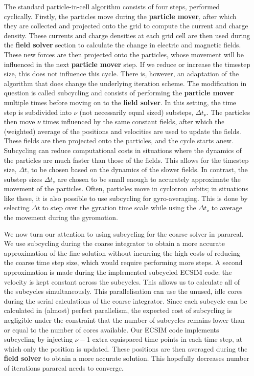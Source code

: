 The standard particle-in-cell algorithm consists of four steps, performed cyclically. Firstly, the particles move during the \textbf{particle mover}, after which they are collected and projected onto the grid to compute the current and charge density. These currents and charge densities at each grid cell are then used during the \textbf{field solver} section to calculate the change in electric and magnetic fields. These new forces are then projected onto the particles, whose movement will be influenced in the next \textbf{particle mover} step. If we reduce or increase the timestep size, this does not influence this cycle. There is, however, an adaptation of the algorithm that does change the underlying iteration scheme. The modification in question is called subcycling and consists of performing the \textbf{particle mover} multiple times before moving on to the \textbf{field solver}. In this setting, the time step is subdivided into $\nu$ (not necessarily equal sized) substeps, $\Delta t_\nu$. The particles then move $\nu$ times influenced by the same constant fields, after which the (weighted) average of the positions and velocities are used to update the fields. These fields are then projected onto the particles, and the cycle starts anew. Subcycling can reduce computational costs in situations where the dynamics of the particles are much faster than those of the fields. This allows for the timestep size, $\Delta t$, to be chosen based on the dynamics of the slower fields. In contrast, the substep sizes $\Delta t_\nu$ are chosen to be small enough to accurately approximate the movement of the particles. Often, particles move in cyclotron orbits; in situations like these, it is also possible to use subcycling for gyro-averaging. This is done by selecting $\Delta t$ to step over the gyration time scale while using the $\Delta t_\nu$ to average the movement during the gyromotion.

We now turn our attention to using subcycling for the coarse solver in parareal. We use subcycling during the coarse integrator to obtain a more accurate approximation of the fine solution without incurring the high costs of reducing the coarse time step size, which would require performing more steps. A second approximation is made during the implemented subcycled ECSIM code; the velocity is kept constant across the subcycles. This allows us to calculate all of the subcycles simultaneously. This parallelisation can use the unused, idle cores during the serial calculations of the coarse integrator. Since each subcycle can be calculated in (almost) perfect parallelism, the expected cost of subcycling is negligible under the constraint that the number of subcycles remains lower than or equal to the number of cores available. Our ECSIM code implements subcycling by injecting $\nu-1$ extra equispaced time points in each time step, at which only the position is updated. These positions are then averaged during the \textbf{field solver} to obtain a more accurate solution. This hopefully decreases number of iterations parareal needs to converge.

